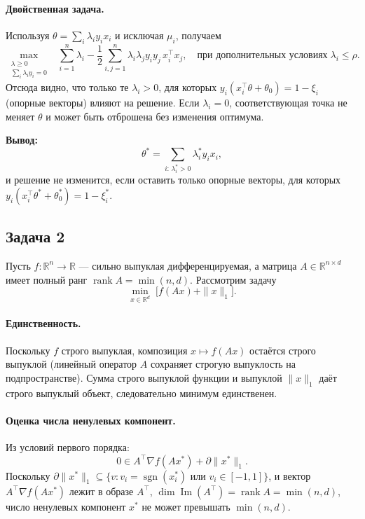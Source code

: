 \documentclass[12pt]{article}
\DeclareMathOperator{\rank}{rank}
\DeclareMathOperator{\Image}{Im}
\DeclareMathOperator{\sgn}{sgn}
\begin{document}
	\paragraph{Двойственная задача.}
	Используя $\theta=\sum_i\lambda_i y_i x_i$ и исключая $\mu_i$, получаем
	\[
	\max_{\substack{\lambda\ge0\\\sum_i\lambda_i y_i=0}}
	\;\;
	\sum_{i=1}^n\lambda_i
	-\frac12\sum_{i,j=1}^n\lambda_i\lambda_j y_i y_j\,x_i^\top x_j,
	\quad
	\text{при дополнительных условиях}\;\lambda_i\le\rho.
	\]
	Отсюда видно, что только те $\lambda_i>0$, для которых
	$y_i(x_i^\top\theta+\theta_0)=1-\xi_i$ (опорные векторы) влияют на
	решение. Если $\lambda_i=0$, соответствующая точка не меняет
	$\theta$ и может быть отброшена без изменения оптимума.
	
	\bigskip
	\textbf{Вывод:} 
	\[
	\theta^* = \sum_{i:\,\lambda_i^*>0} \lambda_i^* y_i x_i,
	\]
	и решение не изменится, если оставить только опорные векторы,
	для которых $y_i(x_i^\top\theta^*+\theta_0^*)=1-\xi_i^*$.
	
	\subsection*{Задача 2}
	Пусть $f:\mathbb R^n\to\mathbb R$ --- сильно выпуклая
	дифференцируемая, а матрица $A\in\mathbb R^{n\times d}$ имеет полный
	ранг $\rank A = \min(n,d)$. Рассмотрим задачу
	\[
	\min_{x\in\mathbb R^d}\;\bigl[f(Ax)+\|x\|_1\bigr].
	\]
	
	\paragraph{Единственность.}
	Поскольку $f$ строго выпуклая, композиция $x\mapsto f(Ax)$ остаётся
	строго выпуклой (линейный оператор $A$ сохраняет строгую выпуклость
	на подпространстве). Сумма строго выпуклой функции и выпуклой
	$\|x\|_1$ даёт строго выпуклый объект, следовательно минимум
	единственен.
	
	\paragraph{Оценка числа ненулевых компонент.}
	Из условий первого порядка:
	\[
	0\in A^\top\nabla f(Ax^*) + \partial\|x^*\|_1.
	\]
	Поскольку
	$\partial\|x^*\|_1\subseteq\{v\colon v_i=\sgn(x^*_i)\text{ или }v_i\in[-1,1]\}$,
	и вектор $A^\top\nabla f(Ax^*)$ лежит в образе $A^\top$,
	$\dim\Image(A^\top)=\rank A=\min(n,d)$, число ненулевых компонент
	$x^*$ не может превышать $\min(n,d)$.
	
\end{document}

